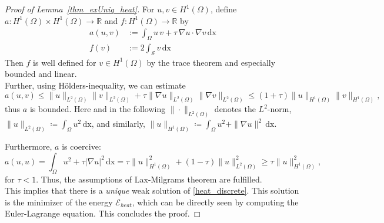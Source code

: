 \documentclass[12pt,openany]{book}
\newcommand{\R}{\mathbb{R}}
\def\S{\mathcal{S}}
\theoremstyle{plainnormal}
\theoremstyle{remark}
\begin{document}
\begin{proof}[Proof of Lemma~\ref{thm_exUniq_heat}]
    For $u,v \in H^1(\Omega)$, define $a: H^1(\Omega)\times H^1(\Omega) \rightarrow \R$ and $f: H^1(\Omega) \rightarrow\R$ by 
    \begin{align*}
        a(u,v) &:= \int_\Omega u\,v + \tau \,\nabla u\cdot\nabla v \,\mathrm{dx}\\
        f(v) & := 2\int_\S v \,\mathrm{dx} 
    \end{align*}
    Then $f$ is well defined for $v \in H^1(\Omega)$ by the trace theorem and especially bounded and linear.\\
    Further, using Hölders-inequality, we can estimate  $$a(u,v) \leq \|u\|_{L^2(\Omega)}\|v\|_{L^2(\Omega)} + \tau \|\nabla u\|_{L^2(\Omega)}\|\nabla v\|_{L^2(\Omega)} \leq (1 + \tau) \|u\|_{H^1(\Omega)}\|v\|_{H^1(\Omega)},$$ thus $a$ is bounded. Here and in the following $\|\cdot\|_{L^2(\Omega)}$ denotes the $L^2$-norm, $\|u\|_{L^2(\Omega)} \coloneqq \int_\Omega u^2\, \mathrm{dx}$, and similarly, $\|u\|_{H^1(\Omega)} \coloneqq \int_\Omega u^2 + \|\nabla u\|^2\, \mathrm{dx}$. \par
    Furthermore, $a$ is coercive:  $$a(u,u) = \int_\Omega u^2 + \tau |\nabla u|^2 \,\mathrm{dx} = \tau \|u\|^2_{H^1(\Omega)} + (1-\tau) \|u\|^2_{L^2(\Omega)} \geq \tau \|u\|^2_{H^1(\Omega)},$$ for $\tau < 1$. Thus, the assumptions of Lax-Milgrams theorem are fulfilled. \\
    This implies that there is a \emph{unique} weak solution of \cref{heat_discrete}. This solution is the minimizer of the energy $\mathcal{E}_{heat}$, which can be directly seen by computing the Euler-Lagrange equation. This concludes the proof.
\end{proof}
\end{document}
